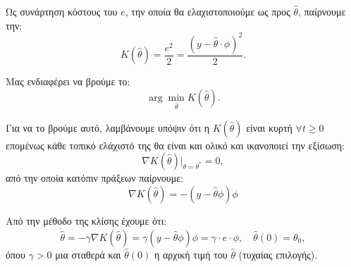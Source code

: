 \documentclass[12pt]{article} %
\numberwithin{equation}{section}  %
\begin{document}
\vspace{+8pt}

\noindent\textbullet\hspace{0.2em} Ως συνάρτηση κόστους του $e$, την οποία θα ελαχιστοποιούμε ως προς $\hat{\theta}$, παίρνουμε την:
\vspace{-\topsep}
\vspace{+3pt}
\[
K(\hat{\theta}) = \frac{e^2}{2} = \frac{(y - \hat{\theta}\cdot \phi)^2}{2}.
\]

\noindent Μας ενδιαφέρει να βρούμε το:
\vspace{-\topsep}
\vspace{+3pt}
\[
\arg \min_{\hat{\theta}} K(\hat{\theta}).
\]

\vspace{+8pt}

\noindent\textbullet\hspace{0.2em} Για να το βρούμε αυτό, λαμβάνουμε υπόψιν ότι η $K(\hat{\theta})$ είναι κυρτή $\forall t \geq 0$\textemdash επομένως κάθε τοπικό ελάχιστό της θα είναι και ολικό και ικανοποιεί την εξίσωση:
\vspace{-\topsep}
\vspace{+3pt}
\[
\nabla K(\hat{\theta})|_{\hat{\theta} = \theta^*} = 0,
\]
από την οποία κατόπιν πράξεων παίρνουμε:
\vspace{-\topsep}
\vspace{+3pt}
\[
\nabla K(\hat{\theta}) = -(y - \hat{\theta} \phi) \phi
\]

\vspace{+8pt}

\noindent\textbullet\hspace{0.2em} Από την μέθοδο της κλίσης έχουμε ότι:
\vspace{-\topsep}
\vspace{+3pt}
\begin{equation}
    \dot{\hat{\theta}} = -\gamma \nabla K(\hat{\theta}) = \gamma(y - \hat{\theta} \phi)\phi = \gamma \cdot e \cdot \phi, \quad \hat{\theta}(0) = \theta_0,
    \label{eq:steep_theta_eq}
\end{equation}
όπου $\gamma > 0$ μια σταθερά και $\hat{\theta}(0)$ η αρχική τιμή του $\hat{\theta}$ (τυχαίας επιλογής).

\vspace{+8pt}
\end{document}

